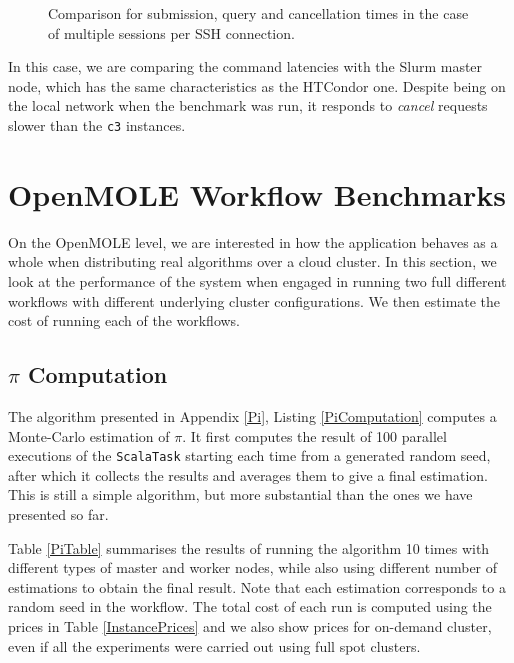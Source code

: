 \begin{figure}[h]
	\centering
	\endminipage \vfill
	\endminipage \hfill
	\endminipage \hfill
	\caption{Comparison for submission, query and cancellation times in the case of multiple sessions per SSH connection.}
	\label{MultiSession}
\end{figure}

In this case, we are comparing the command latencies with the Slurm master node, which has the same characteristics as the HTCondor one. Despite being on the local network when the benchmark was run, it responds to \textit{cancel} requests slower than the \verb|c3| instances.

\section{OpenMOLE Workflow Benchmarks}

On the OpenMOLE level, we are interested in how the application behaves as a whole when distributing real algorithms over a cloud cluster. In this section, we look at the performance of the system when engaged in running two full different workflows with different underlying cluster configurations. We then estimate the cost of running each of the workflows.

\subsection{$\pi$ Computation}

The algorithm presented in Appendix \ref{Pi}, Listing \ref{PiComputation} computes a Monte-Carlo estimation of $\pi$. It first computes the result of 100 parallel executions of the \verb|ScalaTask| starting each time from a generated random seed, after which it collects the results and averages them to give a final estimation. This is still a simple algorithm, but more substantial than the ones we have presented so far.

Table \ref{PiTable} summarises the results of running the algorithm 10 times with different types of master and worker nodes, while also using different number of estimations to obtain the final result. Note that each estimation corresponds to a random seed in the workflow. The total cost of each run is computed using the prices in Table \ref{InstancePrices} and we also show prices for on-demand cluster, even if all the experiments were carried out using full spot clusters.

